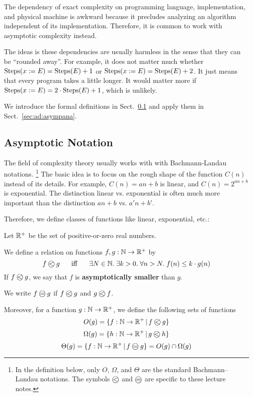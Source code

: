 The dependency of exact complexity on programming language, implementation, and physical machine is awkward because it precludes analyzing an algorithm independent of its implementation.
Therefore, it is common to work with asymptotic complexity instead.

The ideas is these dependencies are usually harmless in the sense that they can be ``rounded away''.
For example, it does not matter much whether $\mathrm{Steps}(x:=E)=\mathrm{Steps}(E)+1$ or $\mathrm{Steps}(x:=E)=\mathrm{Steps}(E)+2$.
It just means that every program takes a little longer.
It would matter more if $\mathrm{Steps}(x:=E)=2\cdot\mathrm{Steps}(E)+1$, which is unlikely.

We introduce the formal definitions in Sect.~\ref{sec:ad:onot} and apply them in Sect.~\ref{sec:ad:asympana}.

\subsection{Asymptotic Notation}\label{sec:ad:onot}

The field of complexity theory usually works with with Bachmann-Landau notations.%
\footnote{In the definition below, only $O$, $\Omega$, and $\Theta$ are the standard Bachmann–Landau notations. The symbols $\Oleq{}{}$ and $\Oeq{}{}$ are specific to these lecture notes.}
The basic idea is to focus on the rough shape of the function $C(n)$ instead of its details.
For example, $C(n)=an+b$ is linear, and $C(n)=2^{an+b}$ is exponential.
The distinction linear vs. exponential is often much more important than the distinction $an+b$ vs. $a'n+b'$. 

Therefore, we define classes of functions like linear, exponential, etc.:

\begin{definition}[O-Notation]\label{def:ad:onot}
Let $\mathbb{R}^+$ be the set of positive-or-zero real numbers.

We define a relation on functions $f,g:\mathbb{N}\to\mathbb{R}^+$ by
\[\Oleq{f}{g} \tb\miff\tb \exists N\in\N.\;\exists k>0.\;  \forall n>N.\; f(n)\leq k\cdot g(n)\]
If $\Oleq{f}{g}$, we say that $f$ is \textbf{asymptotically smaller} than $g$.

We write $\Oeq{f}{g}$ if $\Oleq{f}{g}$ and $\Oleq{g}{f}$.

Moreover, for a function $g:\mathbb{N}\to\mathbb{R}^+$, we define the following sets of functions
\[O(g) = \{f:\N\to\R^+\,|\, \Oleq{f}{g}\}\]
\[\Omega(g) = \{h:\N\to\R^+\,|\, \Oleq{g}{h}\}\]
\[\Theta(g) = \{f:\N\to\R^+\,|\, \Oeq{f}{g} \} = O(g)\cap\Omega(g)\]
\end{definition}


